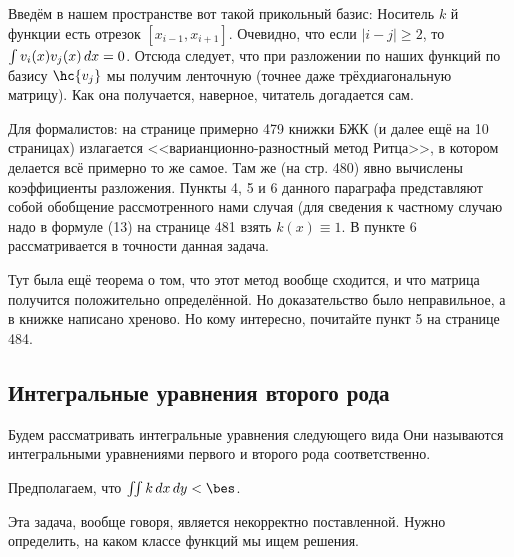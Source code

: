 \documentclass[a4paper]{article}
\begin{document}
Введём в нашем пространстве вот такой прикольный базис:   Носитель $k$ й функции есть отрезок
$[x_{i-1},x_{i+1}]$. Очевидно, что если $|i-j| \ge 2$, то $\int v_i(x)
v_j(x) \,dx = 0$.  Отсюда следует, что при разложении по наших функций
по базису $\hc{v_j}$ мы получим ленточную (точнее даже
трёхдиагональную матрицу).  Как она получается, наверное, читатель
догадается сам.

\begin{petit}
Для формалистов: на странице примерно 479 книжки БЖК (и далее ещё на
10 страницах) излагается <<варианционно-разностный метод Ритца>>, в
котором делается всё примерно то же самое. Там же (на стр. 480) явно
вычислены коэффициенты разложения.  Пункты 4, 5 и 6 данного параграфа
представляют собой обобщение рассмотренного нами случая (для сведения
к частному случаю надо в формуле (13) на странице 481 взять
$k(x)\equiv1$.  В пункте 6 рассматривается в точности данная задача.

Тут была ещё теорема о том, что этот метод вообще сходится, и что
матрица получится положительно определённой.  Но доказательство было
неправильное, а в книжке написано хреново.  Но кому интересно,
почитайте пункт 5 на странице 484.
\end{petit}



\subsection{Интегральные уравнения второго рода}

Будем рассматривать интегральные уравнения следующего вида
  Они называются
интегральными уравнениями первого и второго рода соответственно.

Предполагаем, что $\iint k\dx\dy < \bes$.

Эта задача, вообще говоря, является некорректно поставленной. Нужно
определить, на каком классе функций мы ищем решения.
\end{document}
